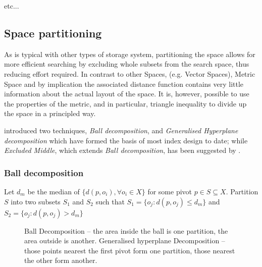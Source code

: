 etc...
\subsection{Space partitioning}
As is typical with other types of storage system, partitioning the space allows for more efficient searching by excluding whole subsets from the search space, thus reducing effort required.  In contrast to other Spaces, (e.g. Vector Spaces), Metric Space and by implication the associated distance function contains very little information about the actual layout of the space.  It is, however, possible to use the properties of the metric, and in particular, triangle inequality to divide up the space in a principled way.  

\cite{Uhlmann:1991} introduced two techniques, \textit{Ball decomposition}, and \textit{Generalised Hyperplane decomposition} which have formed the basis of most index design to date; while \textit{Excluded Middle}, which extends \textit{Ball decomposition}, has been suggested by \cite{Yianilos:1999}.
%  
\subsubsection{Ball decomposition}
%
\begin{mydef}
Let $d_m$ be the median of $\{d(p, o_i), \forall o_i \in X\}$ for some pivot $p \in S \subseteq X$.  Partition $S$ into two subsets $S_1$ and $S_2$ such that $S_1 = \{o_j : d(p, o_j) \leq d_m\}$ and $S_2 = \{o_j : d(p, o_j) > d_m\}$
\end{mydef}
%
\begin{figure}
\centering
{} \quad
{}
\caption[Ball Decomposition vs. Generalised hyperplane Decomposition]{Ball Decomposition -- the area inside the ball is one partition, the area outside is another.
Generalised hyperplane Decomposition -- those points nearest the first pivot form one partition, those nearest the other form another.}
\end{figure}
%
